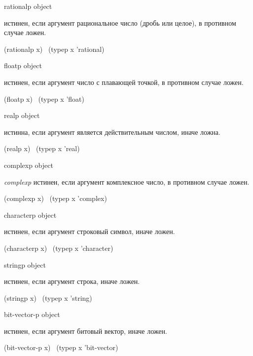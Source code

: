 \begin{defun}[Функция]
rationalp object

 истинен, если аргумент рациональное число (дробь или
целое), в противном случае ложен.
\begin{lisp}
(rationalp x) \EQ\ (typep x 'rational)
\end{lisp}
\end{defun}

\begin{defun}[Функция]
floatp object

 истинен, если аргумент число с плавающей точкой, в
противном случае ложен.
\begin{lisp}
(floatp x) \EQ\ (typep x 'float)
\end{lisp}
\end{defun}

\begin{defun}[Функция]
realp object

 истинна, если аргумент является действительным числом,
иначе ложна.
\begin{lisp}
(realp x) \EQ\ (typep x 'real)
\end{lisp}
\end{defun}

\begin{defun}[Функция]
complexp object

\emph{complexp} истинен, если аргумент комплексное число, в противном
случае ложен.
\begin{lisp}
(complexp x) \EQ\ (typep x 'complex)
\end{lisp}
\end{defun}

\begin{defun}[Функция]
characterp object

 истинен, если аргумент строковый символ, иначе
ложен.
\begin{lisp}
(characterp x) \EQ\ (typep x 'character)
\end{lisp}
\end{defun}

\begin{defun}[Функция]
stringp object

 истинен, если аргумент строка, иначе ложен.
\begin{lisp}
(stringp x) \EQ\ (typep x 'string)
\end{lisp}
\end{defun}

\begin{defun}[Функция]
bit-vector-p object

 истинен, если аргумент битовый вектор, иначе ложен.
\begin{lisp}
(bit-vector-p x) \EQ\ (typep x 'bit-vector)
\end{lisp}
\end{defun}

